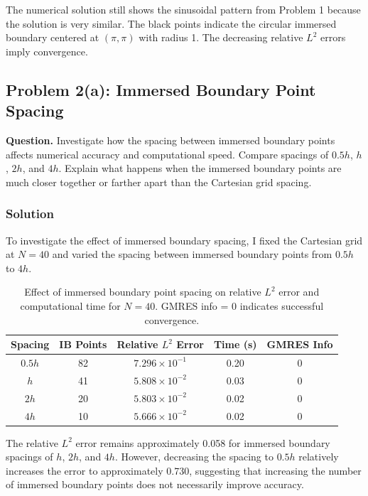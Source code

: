 \documentclass[11pt]{article}
\begin{document}
The numerical solution still shows the sinusoidal pattern from Problem 1 because the solution is very similar. The black points indicate the circular immersed boundary centered at $(\pi,\pi)$ with radius 1. The decreasing relative $L^2$ errors imply convergence.

\newpage
\subsection*{Problem 2(a): Immersed Boundary Point Spacing}

\textbf{Question.}
Investigate how the spacing between immersed boundary
points affects numerical accuracy and computational
speed. Compare spacings of $0.5h$, $h$, $2h$, and $4h$.
Explain what happens when the immersed boundary points
are much closer together or farther apart than the
Cartesian grid spacing.

\subsubsection*{Solution}

To investigate the effect of immersed boundary spacing, I fixed the Cartesian grid at $N=40$ and varied the spacing between immersed boundary points from $0.5h$ to $4h$.

\begin{table}[H]
\centering
\small
\begin{tabular}{ccccc}
\toprule
Spacing & IB Points & Relative $L^2$ Error
& Time (s) & GMRES Info\\
\midrule
$0.5h$ & 82 & $7.296\times10^{-1}$ & 0.20 & 0\\
$h$    & 41 & $5.808\times10^{-2}$ & 0.03 & 0\\
$2h$   & 20 & $5.803\times10^{-2}$ & 0.02 & 0\\
$4h$   & 10 & $5.666\times10^{-2}$ & 0.02 & 0\\
\bottomrule
\end{tabular}
\caption{Effect of immersed boundary point spacing on relative $L^2$ error and computational time for $N=40$. GMRES info = 0 indicates successful convergence.}
\end{table}

The relative $L^2$ error remains approximately 0.058 for immersed boundary spacings of $h$, $2h$, and $4h$. However, decreasing the spacing to $0.5h$ relatively increases the error to approximately 0.730, suggesting that increasing the number of immersed boundary points does not necessarily improve accuracy.
\end{document}
